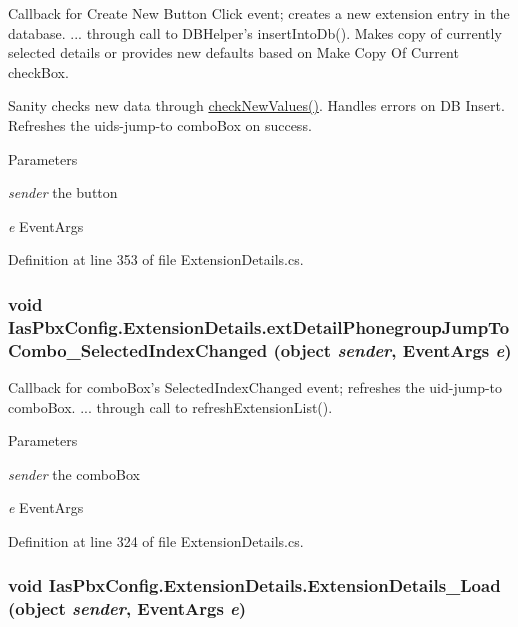 Callback for Create New Button Click event; creates a new extension entry in the database. ... through call to DBHelper's insertIntoDb(). Makes copy of currently selected details or provides new defaults based on Make Copy Of Current checkBox.

Sanity checks new data through \hyperlink{class_ias_pbx_config_1_1_extension_details_ac7daf3d7399d8e980091c5f962f32b0c}{checkNewValues()}. Handles errors on DB Insert. Refreshes the uids-\/jump-\/to comboBox on success.


\begin{DoxyParams}{Parameters}
\item[{\em sender}]the button \item[{\em e}]EventArgs \end{DoxyParams}


Definition at line 353 of file ExtensionDetails.cs.\hypertarget{class_ias_pbx_config_1_1_extension_details_a3f677edf1360b568321649b161dd8738}{
\subsubsection[{extDetailPhonegroupJumpToCombo\_\-SelectedIndexChanged}]{\setlength{\rightskip}{0pt plus 5cm}void IasPbxConfig.ExtensionDetails.extDetailPhonegroupJumpToCombo\_\-SelectedIndexChanged (object {\em sender}, \/  EventArgs {\em e})}}
\label{class_ias_pbx_config_1_1_extension_details_a3f677edf1360b568321649b161dd8738}


Callback for comboBox's SelectedIndexChanged event; refreshes the uid-\/jump-\/to comboBox. ... through call to refreshExtensionList(). 
\begin{DoxyParams}{Parameters}
\item[{\em sender}]the comboBox \item[{\em e}]EventArgs \end{DoxyParams}


Definition at line 324 of file ExtensionDetails.cs.\hypertarget{class_ias_pbx_config_1_1_extension_details_abdafabf4ec7651b421f5db258fba8d85}{
\subsubsection[{ExtensionDetails\_\-Load}]{\setlength{\rightskip}{0pt plus 5cm}void IasPbxConfig.ExtensionDetails.ExtensionDetails\_\-Load (object {\em sender}, \/  EventArgs {\em e})}}
\label{class_ias_pbx_config_1_1_extension_details_abdafabf4ec7651b421f5db258fba8d85}


